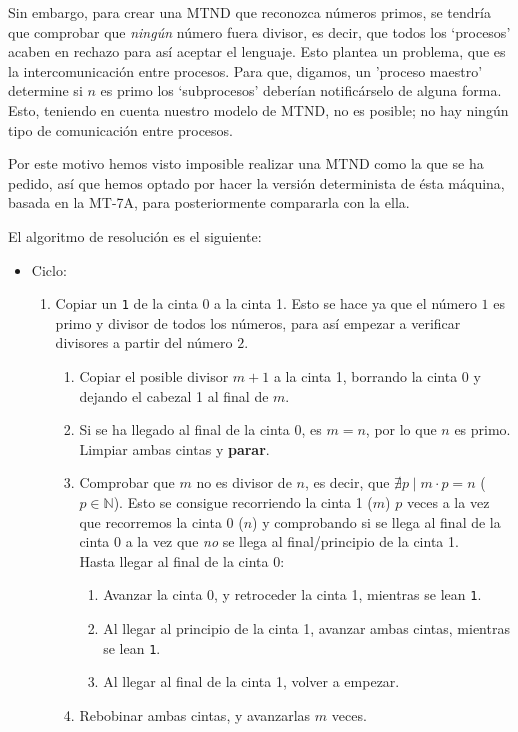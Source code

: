 Sin embargo, para crear una MTND que reconozca números primos, se tendría que comprobar que \textit{ningún} número fuera divisor, es decir, que todos los `procesos' acaben en rechazo para así aceptar el lenguaje. Esto plantea un problema, que es la intercomunicación entre procesos. Para que, digamos, un 'proceso maestro' determine si $n$ es primo los `subprocesos' deberían notificárselo de alguna forma.\\
Esto, teniendo en cuenta nuestro modelo de MTND, no es posible; no hay ningún tipo de comunicación entre procesos.\medskip

Por este motivo hemos visto imposible realizar una MTND como la que se ha pedido, así que hemos optado por hacer la versión determinista de ésta máquina, basada en la MT-7A, para posteriormente compararla con la ella.\bigskip

El algoritmo de resolución es el siguiente:
\begin{itemize}
    \item Ciclo:
    \begin{enumerate}
        \item Copiar un \texttt{1} de la cinta 0 a la cinta 1. Esto se hace ya que el número $1$ es primo y divisor de todos los números, para así empezar a verificar divisores a partir del número $2$.
        \begin{enumerate}
            \item Copiar el posible divisor $m+1$ a la cinta 1, borrando la cinta 0 y dejando el cabezal 1 al final de $m$.
            \item Si se ha llegado al final de la cinta 0, es $m=n$, por lo que $n$ es primo. Limpiar ambas cintas y \textbf{parar}.
            \item Comprobar que $m$ no es divisor de $n$, es decir, que $\nexists p \mid m\cdot p = n$ ($p \in \mathbb{N}$). Esto se consigue recorriendo la cinta 1 ($m$) $p$ veces a la vez que recorremos la cinta 0 ($n$) y comprobando si se llega al final de la cinta 0 a la vez que \textit{no} se llega al final/principio de la cinta 1.\\
            Hasta llegar al final de la cinta 0:
            \begin{enumerate}[1.]
                \item Avanzar la cinta 0, y retroceder la cinta 1, mientras se lean \texttt{1}.
                \item Al llegar al principio de la cinta 1, avanzar ambas cintas, mientras se lean \texttt{1}.
                \item Al llegar al final de la cinta 1, volver a empezar.
            \end{enumerate}
            \item Rebobinar ambas cintas, y avanzarlas $m$ veces.
        \end{enumerate}
    \end{enumerate}
\end{itemize}

